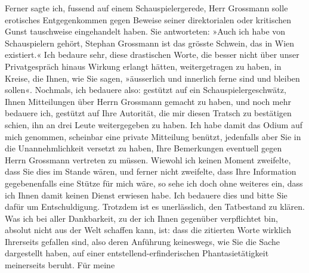 \begin{ledgroupsized}[t]{13cm}
               Ferner sagte ich, fussend auf einem Schauspielergerede, Herr Grossmann solle erotisches Entgegenkommen gegen Beweise seiner
               direktorialen oder kritischen Gunst tauschweise eingehandelt haben. Sie antworteten:
               »Auch ich habe von Schauspielern gehört, Stephan Grossmann ist das grösste Schwein, das in Wien existiert.« Ich bedaure sehr, diese drastischen Worte, die besser nicht
               über unser Privatgespräch hinaus Wirkung erlangt hätten, weitergetragen zu haben, in
               Kreise, die Ihnen, wie Sie sagen, »äusserlich und innerlich ferne sind und bleiben
               sollen«.\pend
           \pstart
           Nochmals, ich bedauere also: gestützt auf ein Schauspielergeschwätz, Ihnen
               Mitteilungen über Herrn Grossmann gemacht zu
               haben, und noch mehr bedauere ich, gestützt auf Ihre Autorität, die mir diesen
               Tratsch zu bestätigen schien, ihn an drei Leute weitergegeben zu haben. Ich habe
               damit das Odium auf mich genommen, scheinbar eine private Mitteilung benützt,
               jedenfalls aber Sie in die Unannehmlichkeit versetzt zu haben, Ihre Bemerkungen
               eventuell gegen Herrn Grossmann vertreten zu
               müssen. Wiewohl ich keinen Moment zweifelte, dass Sie dies im Stande wären, und
               ferner nicht zweifelte, dass Ihre Information gegebenenfalls eine Stütze für mich
               wäre, so sehe ich doch ohne weiteres ein, dass ich Ihnen damit keinen Dienst erwiesen
               habe. Ich bedauere dies und bitte Sie dafür um Entschuldigung. Trotzdem ist es un{\pb}erlässlich, den Tatbestand zu klären. Was ich bei
               aller Dankbarkeit, zu der ich Ihnen gegenüber verpflichtet bin, absolut nicht aus der
               Welt schaffen kann, ist: dass die zitierten Worte wirklich Ihrerseits gefallen sind,
               also deren Anführung keineswegs, wie Sie die Sache dargestellt haben, auf einer
               entstellend-erfinderischen Phantasietätigkeit meinerseits beruht. Für meine

\end{ledgroupsized}
